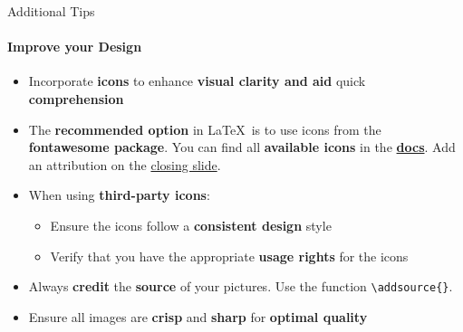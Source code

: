 \documentclass[aspectratio=169]{beamer}
\begin{document}
\begin{frame}
\end{frame}

\begin{frame}{Additional Tips}
    \framesubtitle{Improve your Design}

    \begin{coloredblock}
        \begin{itemize}
            \item Incorporate \textbf{icons} to enhance \textbf{visual clarity and aid }quick \textbf{comprehension}
            \item The \textbf{recommended option} in \LaTeX~is to use icons from the \textbf{fontawesome package}. You can find all \textbf{available icons} in the \href{https://mirror.easyname.at/ctan/fonts/fontawesome5/doc/fontawesome5.pdf}{\textbf{docs}}. Add an attribution on the \hyperlink{frame:closing_slide}{closing slide}.

            \item When using \textbf{third-party icons}:
            \vspace{-0.5\topsep}
            \begin{itemize}
                \item Ensure the icons follow a \textbf{consistent design} style
                \item Verify that you have the appropriate \textbf{usage rights} for the icons
            \end{itemize}
        \end{itemize}
    \end{coloredblock}

        \begin{coloredblock}
            \begin{itemize}
                \item Always \textbf{credit} the \textbf{source} of your pictures. Use the function \texttt{\textbackslash addsource\{\}}.
                \item Ensure all images are \textbf{crisp} and \textbf{sharp} for \textbf{optimal quality}
            \end{itemize}
        \end{coloredblock}
\end{frame}
\end{document}

